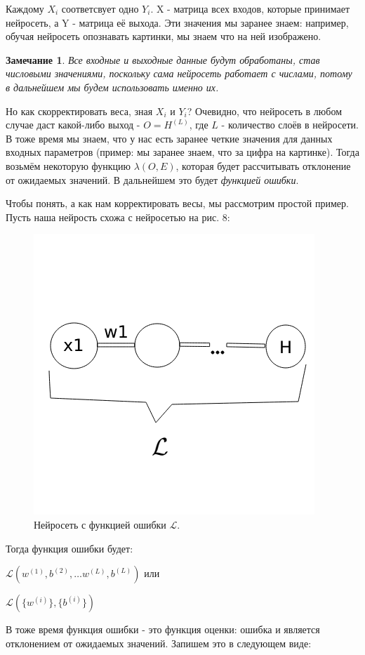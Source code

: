 \documentclass[12pt]{extarticle}
\newtheorem*{remark}{Замечание}
\begin{document}
	Каждому $X_i$ соответсвует одно $Y_i$. X - матрица всех входов, которые принимает нейросеть, а Y - матрица её выхода. Эти значения мы заранее знаем: например, обучая нейросеть опознавать картинки, мы знаем что на ней изображено. 
	
	\begin{remark}
		Все входные и выходные данные будут обработаны, став числовыми значениями, поскольку сама нейросеть работает с числами, потому в дальнейшем мы будем использовать именно их.
	\end{remark}
	
	Но как скорректировать веса, зная $X_i$ и $Y_i$? Очевидно, что нейросеть в любом случае даст какой-либо выход - $O = H^{(L)}$, где $L$ - количество слоёв в нейросети. В тоже время мы знаем, что у нас есть заранее четкие значения для данных входных параметров (пример: мы заранее знаем, что за цифра на картинке). Тогда возьмём некоторую функцию $\lambda(O, E)$, которая будет рассчитывать отклонение от ожидаемых значений. В дальнейшем это будет \textit{функцией ошибки}. 
	
	Чтобы понять, а как нам корректировать весы, мы рассмотрим простой пример. Пусть наша нейрость схожа с нейросетью на  рис. 8:
		
	\begin{figure}[h]
			\centering
			\includegraphics[width=0.5\linewidth]{neuron_algorithm.png}
			\caption{Нейросеть с функцией ошибки $\mathcal{L}$.}
			\label{fig:mpr}
	\end{figure}
	
	\newpage
	
	Тогда функция ошибки будет: 
	
			\centerline{$\mathcal{L}(w^{(1)}, b^{(2)}, \dots w^{(L)}, b^{(L)})$ или}
			\centerline{$\mathcal{L}(\{w^{(i)}\}, \{b^{(i)}\})$}
	
	 В тоже время функция ошибки - это функция оценки: ошибка и является отклонением от ожидаемых значений. Запишем это в следующем виде:
	
\end{document}
